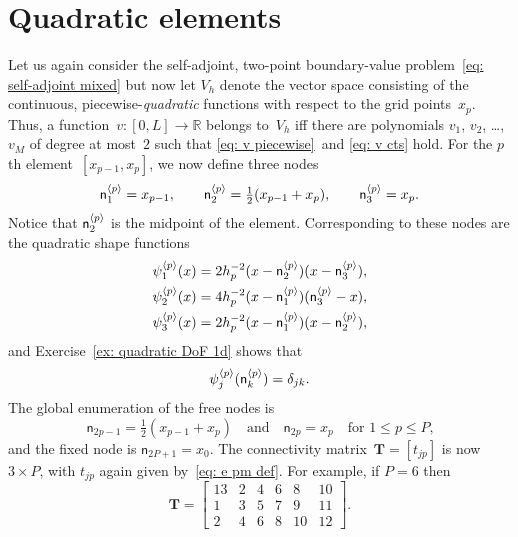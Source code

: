 \section{Quadratic elements}\label{sec: quadratic elements}

Let us again consider the self-adjoint, two-point boundary-value 
problem~\eqref{eq: self-adjoint mixed} but now let $V_h$ denote the vector 
space consisting of the continuous, piecewise-\emph{quadratic} functions with 
respect to the grid points~$x_p$.  Thus, a function~$v:[0,L]\to\mathbb{R}$ 
belongs to~$V_h$ iff there are polynomials $v_1$, $v_2$, \dots, $v_M$ of degree 
at most~$2$ such that \eqref{eq: v piecewise}~and \eqref{eq: v cts} hold.
For the $p$th element~$[x_{p-1},x_p]$, we now define three nodes
\[
\mathsf{n}^{\langle p\rangle}_1=x_{p-1},\qquad
\mathsf{n}^{\langle p\rangle}_2=\tfrac12(x_{p-1}+x_p),\qquad
\mathsf{n}^{\langle p\rangle}_3=x_p.
\]
Notice that $\mathsf{n}^{\langle p\rangle}_2$ is the midpoint of the element.
Corresponding to these nodes are the quadratic shape functions
\begin{equation}\label{eq: quadratic psi 1d}
\begin{aligned}
\psi^{\langle p\rangle}_1(x)
	&=2h_p^{-2}(x-\mathsf{n}^{\langle p\rangle}_2)(x-\mathsf{n}^{\langle p\rangle}_3),\\
\psi^{\langle p\rangle}_2(x)
	&=4h_p^{-2}(x-\mathsf{n}^{\langle p\rangle}_1)(\mathsf{n}^{\langle p\rangle}_3-x),\\
\psi^{\langle p\rangle}_3(x)
	&=2h_p^{-2}(x-\mathsf{n}^{\langle p\rangle}_1)(x-\mathsf{n}^{\langle p\rangle}_2),
\end{aligned}
\end{equation}
and Exercise~\ref{ex: quadratic DoF 1d} shows that
\begin{equation}\label{eq: quadratic DoF 1d}
\psi^{\langle p\rangle}_j(\mathsf{n}^{\langle p\rangle}_k)=\delta_{jk}.
\end{equation}
The global enumeration of the free nodes is
\[
\mathsf{n}_{2p-1}=\tfrac12(x_{p-1}+x_p)
\quad\text{and}\quad
\mathsf{n}_{2p}=x_p\quad\text{for $1\le p\le P$,}
\]
and the fixed node is $\mathsf{n}_{2P+1}=x_0$.  The connectivity 
matrix~$\boldsymbol{T}=[t_{jp}]$ is now $3\times P$, with $t_{jp}$ again given 
by~\eqref{eq: e pm def}.  For example, if $P=6$ then 
\[
\boldsymbol{T}=\begin{bmatrix}
13&2&4&6&8&10\\
 1&3&5&7&9&11\\
 2&4&6&8&10&12          
\end{bmatrix}.
\]

